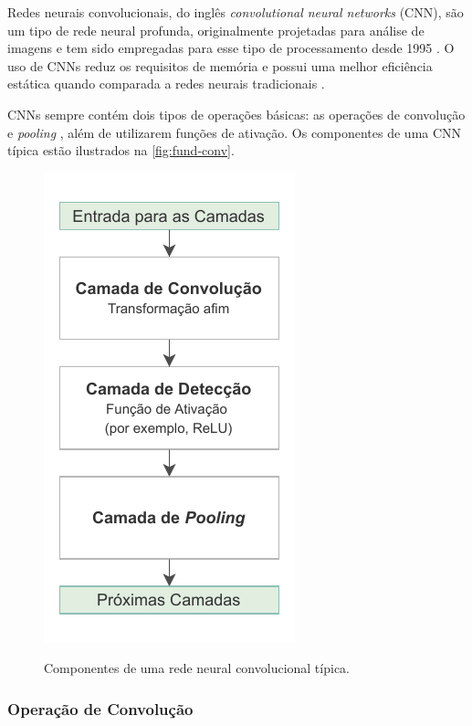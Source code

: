 Redes neurais convolucionais, do inglês \textit{convolutional neural networks} (CNN), são um tipo de rede neural profunda, originalmente projetadas para análise de imagens \cite{ref:Eden-Ierapetritou-Towler} e tem sido empregadas para esse tipo de processamento desde 1995 \cite{ref:Yan}. O uso de CNNs reduz os requisitos de memória e possui uma melhor eficiência estática quando comparada a redes neurais tradicionais \cite{ref:Goodfellow-Bengio-Courville}.

CNNs sempre contém dois tipos de operações básicas: as operações de convolução e \textit{pooling} \cite{ref:Eden-Ierapetritou-Towler}, além de utilizarem funções de ativação. Os componentes de uma CNN típica estão ilustrados na \autoref{fig:fund-conv}.

\begin{figure}[h!] %
  \centering
  \caption{Componentes de uma rede neural convolucional típica.}
  \includegraphics[scale=1.1]{img/img-fundamentacao-conv.pdf}
  \label{fig:fund-conv}
\end{figure}

\subsubsection{Operação de Convolução} \label{cap:fund-ia-rn-conv-conv}

